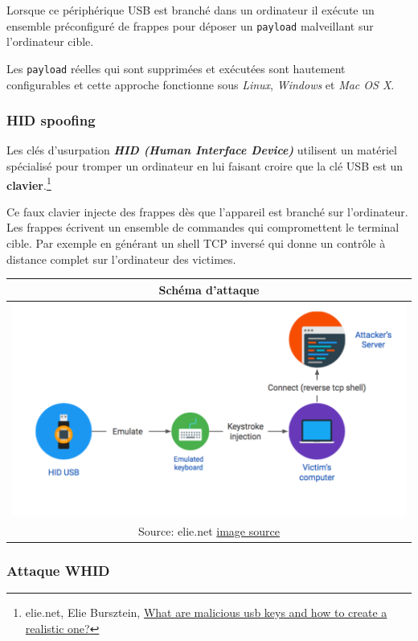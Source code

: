 \documentclass[
  french,
  paper=a4,
  ,captions=tableheading
]{scrartcl}
\begin{document}
Lorsque ce périphérique USB est branché dans un ordinateur il exécute un
ensemble préconfiguré de frappes pour déposer un \texttt{payload}
malveillant sur l'ordinateur cible.

Les \texttt{payload} réelles qui sont supprimées et exécutées sont
hautement configurables et cette approche fonctionne sous \emph{Linux},
\emph{Windows} et \emph{Mac OS X}.

\hypertarget{hid-spoofing}{%
\subsubsection{HID spoofing}\label{hid-spoofing}}

Les clés d'usurpation \textbf{\emph{HID (Human Interface Device)}}
utilisent un matériel spécialisé pour tromper un ordinateur en lui
faisant croire que la clé USB est un \textbf{clavier}.\footnote{elie.net,
  Elie Bursztein,
  \href{https://elie.net/blog/security/what-are-malicious-usb-keys-and-how-to-create-a-realistic-one/}{What
  are malicious usb keys and how to create a realistic one?}}

Ce faux clavier injecte des frappes dès que l'appareil est branché sur
l'ordinateur. Les frappes écrivent un ensemble de commandes qui
compromettent le terminal cible. Par exemple en générant un shell TCP
inversé qui donne un contrôle à distance complet sur l'ordinateur des
victimes.

\begin{longtable}[]{@{}c@{}}
\toprule
Schéma d'attaque\tabularnewline
\midrule
\endhead
\includegraphics{images/1.png}\tabularnewline
Source: elie.net
\href{https://elie.net/blog/security/what-are-malicious-usb-keys-and-how-to-create-a-realistic-one/}{image
source}\tabularnewline
\bottomrule
\end{longtable}

\hypertarget{attaque-whid}{%
\subsubsection{Attaque WHID}\label{attaque-whid}}
\end{document}
